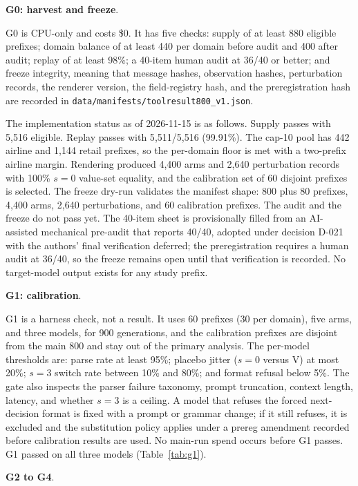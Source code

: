 \documentclass[a4paper,fleqn]{cas-sc}
\begin{document}
\noindent\textbf{G0: harvest and freeze}.\

G0 is CPU-only and costs \$0. It has five checks: supply of at least 880 eligible prefixes;
domain balance of at least 440 per domain before audit and 400 after audit; replay of at least
98\%; a 40-item human audit at 36/40 or better; and freeze integrity, meaning that message hashes,
observation hashes, perturbation records, the renderer version, the field-registry hash, and the
preregistration hash are recorded in \texttt{data/manifests/toolresult800\_v1.json}.

The implementation status as of 2026-11-15 is as follows. Supply passes with 5{,}516 eligible.
Replay passes with 5{,}511/5{,}516 (99.91\%). The cap-10 pool has 442 airline and 1{,}144 retail
prefixes, so the per-domain floor is met with a two-prefix airline margin. Rendering produced
4{,}400 arms and 2{,}640 perturbation records with 100\% $s=0$ value-set equality, and the
calibration set of 60 disjoint prefixes is selected. The freeze dry-run validates the manifest
shape: 800 plus 80 prefixes, 4{,}400 arms, 2{,}640 perturbations, and 60 calibration prefixes.
The audit and the freeze do not pass yet. The 40-item sheet is provisionally filled from an
AI-assisted mechanical pre-audit that reports 40/40, adopted under decision D-021 with the
authors' final verification deferred; the preregistration requires a human audit at 36/40, so the
freeze remains open until that verification is recorded. No target-model output exists for any
study prefix.

\noindent\textbf{G1: calibration}.\

G1 is a harness check, not a result. It uses 60 prefixes (30 per domain), five arms, and three
models, for 900 generations, and the calibration prefixes are disjoint from the main 800 and stay
out of the primary analysis. The per-model thresholds are: parse rate at least 95\%; placebo
jitter ($s=0$ versus V) at most 20\%; $s=3$ switch rate between 10\% and 80\%; and format refusal
below 5\%. The gate also inspects the parser failure taxonomy, prompt truncation, context length,
latency, and whether $s=3$ is a ceiling. A model that refuses the forced next-decision format is
fixed with a prompt or grammar change; if it still refuses, it is excluded and the substitution
policy applies under a prereg amendment recorded before calibration results are used. No
main-run spend occurs before G1 passes. G1 passed on all three models (Table~\ref{tab:g1}).

\noindent\textbf{G2 to G4}.\
\end{document}
